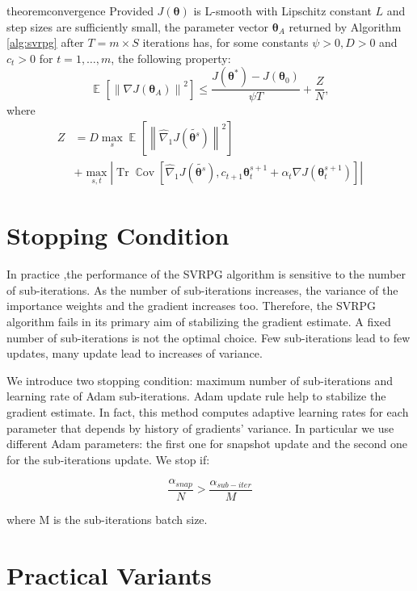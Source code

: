 \documentclass{article}
\theoremstyle{remark}
\theoremstyle{definition}
\DeclareMathOperator*{\EV}{\mathbb{E}}
\DeclareMathOperator{\Tr}{Tr}
\DeclareMathOperator*{\Cov}{\mathbb{C}ov}
\newcommand{\EVV}[2][\ppvect \in \ppspace]{\EV_{#1}\left[{#2}\right]}
\newcommand{\norm}[2][\infty]{\left\|#2\right\|_{#1}}
\newcommand{\vtheta}{\boldsymbol{\theta}}
\newcommand{\gradApp}[2]{\hat{\nabla}_{#2}J(#1)}
\begin{document}
\begin{restatable}{theorem}{convergence}\label{theo:convergence}
Provided $J(\vtheta)$ is L-smooth with Lipschitz constant $L$ and step sizes are sufficiently small, the parameter vector $\vtheta_A$ returned by Algorithm \ref{alg:svrpg} after $T=m\times S$ iterations has, for some constants $\psi>0, D>0$ and $c_{t}>0$ for $t=1,\dots,m$, the following property:
\[
	\EVV[]
	{\norm[]{\nabla J(\vtheta_A)}^2} \leq
		\frac{J(\vtheta^*)-J(\vtheta_0)}{\psi T} +
		\frac{Z}{N},
\]
where
\begin{align*}
	Z &= D\max_{s}\EVV[]{\norm[]{\gradApp{\tilde{\vtheta^s}}{1}}^2} \\
	&+ \max_{s,t}\left|\Tr\Cov\left[
		\gradApp{\tilde{\vtheta^s}}{1},
		c_{t+1}\vtheta_t^{s+1} + \alpha_t\nabla J(\vtheta_t^{s+1})\right]\right|
\end{align*}
\end{restatable}

\section{Stopping Condition}\label{sec:stopping}
In practice ,the performance of the SVRPG algorithm is sensitive to the number of sub-iterations.
As the number of sub-iterations increases, the variance of the importance weights and the gradient increases too.
Therefore, the SVRPG algorithm fails in its primary aim of stabilizing the gradient estimate.
A fixed number of sub-iterations is not the optimal choice.
Few sub-iterations lead to few updates, many update lead to increases of variance.

We introduce two stopping condition: maximum number of sub-iterations and learning rate of Adam sub-iterations.
Adam update rule help to stabilize the gradient estimate. In fact, this method computes adaptive learning rates for each parameter that depends by history of gradients' variance.
In particular we use different Adam parameters: the first one for snapshot update and the second one for the sub-iterations update.
We stop if:

\[\frac{\alpha_{snap}}{N}>\frac{\alpha_{sub-iter}}{M}\]

where M is the sub-iterations batch size.

\section{Practical Variants}
\end{document}
